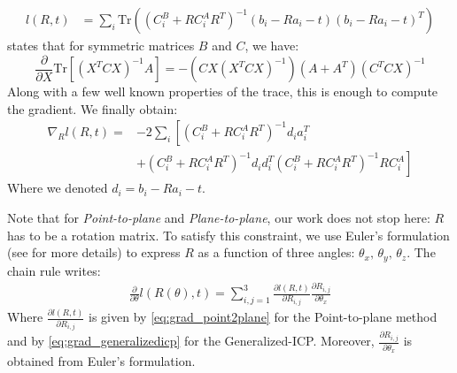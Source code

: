 \documentclass[11pt,letterpaper,leqno]{article}
\begin{document}
\begin{itemize}
    \begin{align*}
        l(R,t) &= \sum_i \text{Tr}(\left(C_i^B + R C_i^A R^T\right)^{-1} (b_i - R a_i - t) (b_i - R a_i - t)^T)
    \end{align*}
    \cite{cookbook} states that for symmetric matrices $B$ and $C$, we have: $$\frac{\partial}{\partial X} \text{Tr}\left[(X^TCX)^{-1} A\right] = -(CX(X^TCX)^{-1})(A+A^T)(C^TCX)^{-1}$$
    Along with a few well known properties of the trace, this is enough to compute the gradient. We finally obtain:
    \begin{align}
        \nabla_R l(R,t) =& - 2 \sum_i \left[ \left(C_i^B + R C_i^A R^T\right)^{-1} d_i a_i^T \right. \label{eq:grad_generalizedicp}\\ &+\left. \left(C_i^B + R C_i^A R^T\right)^{-1} d_i d_i^T \left(C_i^B + R C_i^A R^T\right)^{-1} R C_i^A\right] \nonumber
    \end{align}
    Where we denoted $d_i = b_i - R a_i - t$.
\end{itemize}
Note that for \textit{Point-to-plane} and \textit{Plane-to-plane}, our work does not stop here: $R$ has to be a rotation matrix. To satisfy this constraint, we use Euler's formulation (see \cite{rotmat} for more details) to express $R$ as a function of three angles: $\theta_x, \, \theta_y, \, \theta_z$. The chain rule writes:
\begin{align*}
    \frac{\partial}{\partial \theta} l(R(\theta), t) = \sum_{i,j = 1}^3 \frac{\partial l(R, t)}{\partial R_{i,j}} \frac{\partial R_{i,j}}{\partial \theta_x}
\end{align*}
Where $\frac{\partial l(R, t)}{\partial R_{i,j}}$ is given by \eqref{eq:grad_point2plane} for the Point-to-plane method and by \eqref{eq:grad_generalizedicp} for the Generalized-ICP. Moreover, $\frac{\partial R_{i,j}}{\partial \theta_x}$ is obtained from Euler's formulation.
\end{document}
